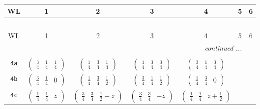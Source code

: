 \documentclass[fleqn,9pt,landscape]{jsarticle}
\begin{document}
\begin{center}
\renewcommand{\arraystretch}{1.2}
\begin{longtable}{ccccccc}
 \hline \hline
WL & 1 & 2 & 3 & 4 & 5 & 6 \\ \hline \endfirsthead

\multicolumn{6}{l}{\tablename\ \thetable{}} \\
 \hline \hline
WL & 1 & 2 & 3 & 4 & 5 & 6 \\ \hline \endhead

 \hline \hline
\multicolumn{6}{r}{\footnotesize\it continued ...} \\ \endfoot

 \hline \hline
\multicolumn{6}{r}{} \\ \endlastfoot

{\tt 4a} & $ \begin{pmatrix} \frac{3}{4} & \frac{1}{4} & \frac{1}{4} \end{pmatrix} $ & $ \begin{pmatrix} \frac{1}{4} & \frac{3}{4} & \frac{1}{4} \end{pmatrix} $ & $ \begin{pmatrix} \frac{1}{4} & \frac{3}{4} & \frac{3}{4} \end{pmatrix} $ & $ \begin{pmatrix} \frac{3}{4} & \frac{1}{4} & \frac{3}{4} \end{pmatrix} $ & $  $ & $  $ \\ \hline
{\tt 4b} & $ \begin{pmatrix} \frac{3}{4} & \frac{1}{4} & 0 \end{pmatrix} $ & $ \begin{pmatrix} \frac{1}{4} & \frac{3}{4} & \frac{1}{2} \end{pmatrix} $ & $ \begin{pmatrix} \frac{3}{4} & \frac{1}{4} & \frac{1}{2} \end{pmatrix} $ & $ \begin{pmatrix} \frac{1}{4} & \frac{3}{4} & 0 \end{pmatrix} $ & $  $ & $  $ \\ \hline
{\tt 4c} & $ \begin{pmatrix} \frac{1}{4} & \frac{1}{4} & z \end{pmatrix} $ & $ \begin{pmatrix} \frac{3}{4} & \frac{3}{4} & \frac{1}{2} - z \end{pmatrix} $ & $ \begin{pmatrix} \frac{3}{4} & \frac{3}{4} & - z \end{pmatrix} $ & $ \begin{pmatrix} \frac{1}{4} & \frac{1}{4} & z + \frac{1}{2} \end{pmatrix} $ & $  $ & $  $ \\ \hline

\end{longtable}
\end{center}
\end{document}
